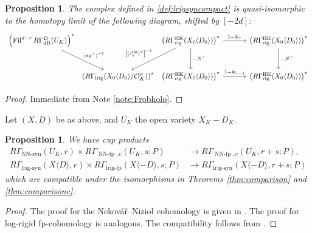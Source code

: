 \documentclass[cjm]{ipart}
\theoremstyle{plain}
\newtheorem{proposition}[theorem]{Proposition}
\theoremstyle{remark}
\DeclareMathOperator{\Fil}{Fil}
\DeclareMathOperator{\HK}{HK}
\DeclareMathOperator{\lrigfp}{lrig-fp}
\DeclareMathOperator{\lrigsyn}{lrig-syn}
\DeclareMathOperator{\lrig}{lrig}
\DeclareMathOperator{\NNfp}{NN-fp}
\DeclareMathOperator{\NNsyn}{NN-syn}
\newcommand{\Nek}{Nekov\'a\v{r}\xspace}
\newcommand{\Niz}{Nizio\l\xspace}
\newcommand{\cO}{\mathcal{O}}
\newcommand{\dR}{\mathrm{dR}}
\newcommand{\rig}{\mathrm{rig}}
\numberwithin{equation}{subsection}
\begin{document}
 \begin{proposition}\label{prop:lrigqisom}
  The complex defined in \ref{def:lrigsyncompact} is quasi-isomorphic to the homotopy limit of the following diagram, shifted by $[-2d]$:
  \[
  \begin{tikzcd}[row sep=large, column sep=0.2em]
  \left(\Fil^{d-r} R\Gamma_{\dR}^D(U_K)\right)^*
    \arrow[dr, "{(\operatorname{sp}^\vee)^{-1}}"]
  &
  {} &
  \left(R\Gamma_{\rig}^{\HK}(X_0\langle D_0\rangle)\right)^*
    \arrow[dl, "{\left[(\iota_\pi^{\rig})^\vee\right]^{-1}}"']
    \arrow[d, "{-N^\vee}"]
    \arrow[rr, "{1-\Phi_r}"]
  &
  \hspace{2em}
  &
  \left(R\Gamma_{\rig}^{\HK}(X_0\langle D_0\rangle)\right)^*
    \arrow[d, "{-N^\vee}"]
  \\
  {} &
  \left(R\Gamma_{\lrig}(X_0\langle D_0 \rangle / \cO_K^\pi)\right)^*
  &
  \left(R\Gamma_{\rig}^{\HK}(X_0\langle D_0\rangle)\right)^*
    \arrow[rr, "{1-\Phi_{r-1}}"]
  &
  &
  \left(R\Gamma_{\rig}^{\HK}(X_0\langle D_0\rangle)\right)^*
  \end{tikzcd}
  \]
%  
 \end{proposition}
 \begin{proof}
  Immediate from Note \ref{note:Frobholo}.
 \end{proof}



  Let $(X, D)$ be as above, and $U_K$ the open variety $X_K - D_K$.

  \begin{proposition}
   We have cup products
   \begin{align}
    R\Gamma_{\NNsyn}(U_K,r) \times R\Gamma_{\NNfp,c}(U_K,s;P) &
    \to R\Gamma_{\NNfp,c}(U_K,r+s;P) ,\label{eq:pairingNN}\\
    R\Gamma_{\lrigsyn}(X\langle D \rangle,r) \times R\Gamma_{\lrigfp}(X\langle -D \rangle,s;P) & \to R\Gamma_{\lrigsyn}(X\langle-D\rangle,r+s; P)\label{eq:pairinglrig}
   \end{align}
   which are compatible under the isomorphisms in Theorems \ref{thm:comparison} and \ref{thm:comparisonc}.
  \end{proposition}
  \begin{proof}
   The proof for the \Nek--\Niz cohomology is given in \cite{besserloefflerzerbes16}. The proof for  log-rigid fp-cohomology is analogous. The compatibility follows from \cite{ertlyamada19}.
  \end{proof}
\end{document}
